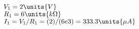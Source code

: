 
\mbox{$V_{1}=\mbox{$2 \units{ V}$}$}\\
\mbox{$R_{1}=\mbox{$6 \units{k \Omega}$}$}\\
\mbox{$I_{1} = V_{1}/R_{1}  =  (2)/(6e3) = \mbox{$333.3 \units{\mu A}$}$}

